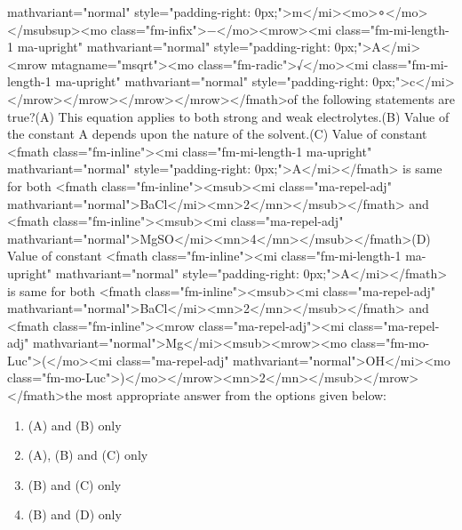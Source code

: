 \documentclass{article}
\begin{document}
mathvariant="normal" style="padding-right: 0px;">m</mi><mo>∘</mo></msubsup><mo class="fm-infix">−</mo><mrow><mi class="fm-mi-length-1 ma-upright" mathvariant="normal" style="padding-right: 0px;">A</mi><mrow mtagname="msqrt"><mo class="fm-radic">√</mo><mi class="fm-mi-length-1 ma-upright" mathvariant="normal" style="padding-right: 0px;">c</mi></mrow></mrow></mrow></mrow></fmath>\newlineWhich of the following statements are true?\newline(A) This equation applies to both strong and weak electrolytes.\newline(B) Value of the constant A depends upon the nature of the solvent.\newline(C) Value of constant <fmath class="fm-inline"><mi class="fm-mi-length-1 ma-upright" mathvariant="normal" style="padding-right: 0px;">A</mi></fmath> is same for both <fmath class="fm-inline"><msub><mi class="ma-repel-adj" mathvariant="normal">BaCl</mi><mn>2</mn></msub></fmath> and <fmath class="fm-inline"><msub><mi class="ma-repel-adj" mathvariant="normal">MgSO</mi><mn>4</mn></msub></fmath>\newline(D) Value of constant <fmath class="fm-inline"><mi class="fm-mi-length-1 ma-upright" mathvariant="normal" style="padding-right: 0px;">A</mi></fmath> is same for both <fmath class="fm-inline"><msub><mi class="ma-repel-adj" mathvariant="normal">BaCl</mi><mn>2</mn></msub></fmath> and <fmath class="fm-inline"><mrow class="ma-repel-adj"><mi class="ma-repel-adj" mathvariant="normal">Mg</mi><msub><mrow><mo class="fm-mo-Luc">(</mo><mi class="ma-repel-adj" mathvariant="normal">OH</mi><mo class="fm-mo-Luc">)</mo></mrow><mn>2</mn></msub></mrow></fmath>\newlineChoose the most appropriate answer from the options given below:\newline 
\begin{enumerate}[label=(\alph*)]
\item  (A) and (B) only
\item  (A), (B) and (C) only
\item  (B) and (C) only
\item  (B) and (D) only
\end{enumerate}
\newpage
\end{document}
